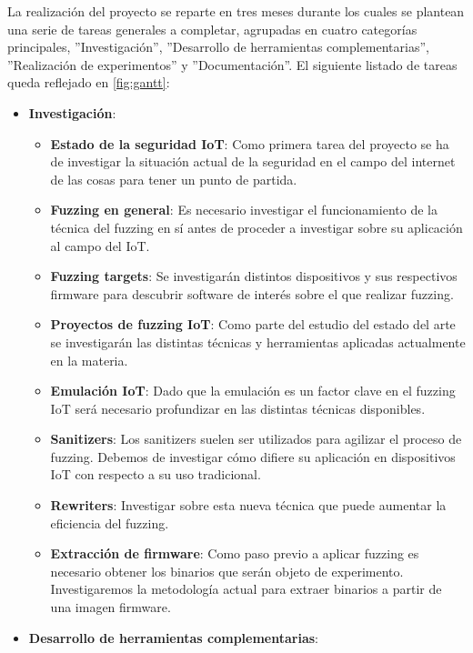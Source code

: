 La realización del proyecto se reparte en tres meses durante los cuales se plantean una serie de tareas generales a completar,
agrupadas en cuatro categorías principales, ''Investigación'', ''Desarrollo de herramientas complementarias'', ''Realización de 
experimentos'' y ''Documentación''. El siguiente listado de tareas queda reflejado en \ref{fig:gantt}:
\begin{itemize}
    \item \textbf{Investigación}: 
    \begin{itemize}
        \item \textbf{Estado de la seguridad IoT}: Como primera tarea del proyecto se ha de investigar la situación actual de la seguridad
        en el campo del internet de las cosas para tener un punto de partida.
        \item \textbf{Fuzzing en general}: Es necesario investigar el funcionamiento de la técnica del fuzzing en sí antes de proceder a 
        investigar sobre su aplicación al campo del IoT.
        \item \textbf{Fuzzing targets}: Se investigarán distintos dispositivos y sus respectivos firmware para descubrir software de interés
        sobre el que realizar fuzzing.
        \item \textbf{Proyectos de fuzzing IoT}: Como parte del estudio del estado del arte se investigarán las distintas técnicas y herramientas 
        aplicadas actualmente en la materia.
        \item \textbf{Emulación IoT}: Dado que la emulación es un factor clave en el fuzzing IoT será necesario profundizar en las distintas 
        técnicas disponibles.
        \item \textbf{Sanitizers}: Los sanitizers suelen ser utilizados para agilizar el proceso de fuzzing. Debemos de investigar cómo difiere
        su aplicación en dispositivos IoT con respecto a su uso tradicional.
        \item \textbf{Rewriters}: Investigar sobre esta nueva técnica que puede aumentar la eficiencia del fuzzing.
        \item \textbf{Extracción de firmware}: Como paso previo a aplicar fuzzing es necesario obtener los binarios que serán objeto de
        experimento. Investigaremos la metodología actual para extraer binarios a partir de una imagen firmware.
    \end{itemize}
    \item \textbf{Desarrollo de herramientas complementarias}:
    \begin{itemize}

\end{itemize}
\end{itemize}
